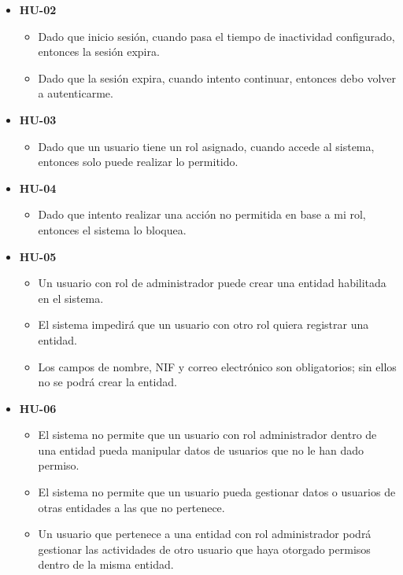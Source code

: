 \begin{itemize}
    \item \textbf{HU-02}
    \begin{itemize}
        \item Dado que inicio sesión, cuando pasa el tiempo de inactividad configurado, entonces la sesión expira.
        \item Dado que la sesión expira, cuando intento continuar, entonces debo volver a autenticarme.
    \end{itemize}
\end{itemize}

\begin{itemize}
    \item \textbf{HU-03}
    \begin{itemize}
        \item Dado que un usuario tiene un rol asignado, cuando accede al sistema, entonces solo puede realizar lo permitido.
    \end{itemize}
\end{itemize}

\begin{itemize}
    \item \textbf{HU-04}
    \begin{itemize}
        \item Dado que intento realizar una acción no permitida en base a mi rol, entonces el sistema lo bloquea.
    \end{itemize}
\end{itemize}

\begin{itemize}
    \item \textbf{HU-05}
    \begin{itemize}
        \item Un usuario con rol de administrador puede crear una entidad habilitada en el sistema.
        \item El sistema impedirá que un usuario con otro rol quiera registrar una entidad.
        \item Los campos de nombre, NIF y correo electrónico son obligatorios; sin ellos no se podrá crear la entidad.
    \end{itemize}
\end{itemize}

\begin{itemize}
    \item \textbf{HU-06}
    \begin{itemize}
        \item El sistema no permite que un usuario con rol administrador dentro de una entidad pueda manipular datos de usuarios que no le han dado permiso.
        \item El sistema no permite que un usuario pueda gestionar datos o usuarios de otras entidades a las que no pertenece.
        \item Un usuario que pertenece a una entidad con rol administrador podrá gestionar las actividades de otro usuario que haya otorgado permisos dentro 
        de la misma entidad.
    \end{itemize}
\end{itemize}

